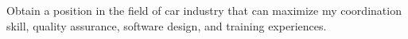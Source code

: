 Obtain a position in the field of car industry
that can maximize my coordination skill,
     quality assurance,
     software design,
     and training experiences.
